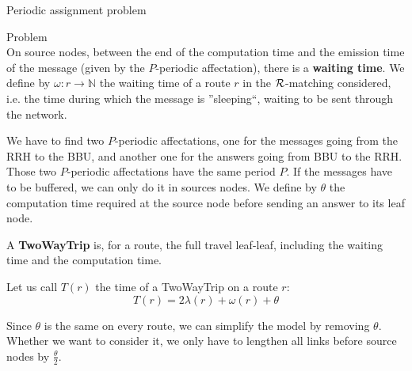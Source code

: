 \documentclass[a4paper,10pt]{report}
\begin{document}
\begin{chapter}{Periodic assignment problem}
\begin{section}{Problem}
\\

On source nodes, between the end of the computation time and the emission time of the message (given by the $P$-periodic affectation), there is a {\bf waiting time}. 
We define by $\omega: r \rightarrow \mathbb{N}$ the waiting time of a route $r$ in the ${\cal R}$-matching considered, i.e. the time during which the
message is ''sleeping``, waiting to be sent through the network.


We have to find two $P$-periodic affectations, one for the messages going from the RRH to the BBU, and another one for the answers going from BBU to the RRH. Those two $P$-periodic affectations have the same period $P$. 
If the messages have to be buffered, we can only do it in sources nodes.
We define by $\theta$ the computation time required at the source node before sending an answer to its leaf node.

A {\bf TwoWayTrip} is, for a route, the full travel leaf-leaf, including the waiting time and the computation time.

Let us call $T (r)$ the time of a TwoWayTrip on a route $r$: $$ T (r) = 2\lambda (r) + \omega (r) + \theta$$

Since $\theta$ is the same on every route, we can simplify the model by removing $\theta$. Whether we want to consider it, we only have to lengthen all 
links before source nodes by $\frac{\theta}{2}$. 



\end{section}
\end{chapter}
\end{document}
